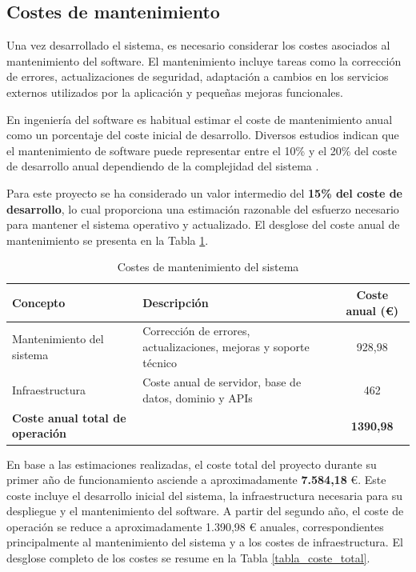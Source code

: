 \subsection{Costes de mantenimiento}

Una vez desarrollado el sistema, es necesario considerar los costes asociados al mantenimiento del software. El mantenimiento incluye tareas como la corrección de errores, actualizaciones de seguridad, adaptación a cambios en los servicios externos utilizados por la aplicación y pequeñas mejoras funcionales.

En ingeniería del software es habitual estimar el coste de mantenimiento anual como un porcentaje del coste inicial de desarrollo. Diversos estudios indican que el mantenimiento de software puede representar entre el 10\% y el 20\% del coste de desarrollo anual dependiendo de la complejidad del sistema \cite{pressman2014software}.

Para este proyecto se ha considerado un valor intermedio del \textbf{15\% del coste de desarrollo}, lo cual proporciona una estimación razonable del esfuerzo necesario para mantener el sistema operativo y actualizado. El desglose del coste anual de mantenimiento se presenta en la Tabla \ref{tabla_coste_mantenimiento}.


\begin{table}[H]
\centering
\caption{Costes de mantenimiento del sistema}
\label{tabla_coste_mantenimiento}
\begin{tabular}{|p{6cm}|p{6cm}|c|}
\hline
\textbf{Concepto} & \textbf{Descripción} & \textbf{Coste anual (€)} \\ \hline

Mantenimiento del sistema &
Corrección de errores, actualizaciones, mejoras y soporte técnico &
928,98 \\ \hline

Infraestructura &
Coste anual de servidor, base de datos, dominio y APIs &
462 \\ \hline

\textbf{Coste anual total de operación} & & \textbf{1390,98} \\ \hline

\end{tabular}
\end{table}

En base a las estimaciones realizadas, el coste total del proyecto durante su primer año de funcionamiento asciende a aproximadamente \textbf{7.584,18} €. Este coste incluye el desarrollo inicial del sistema, la infraestructura necesaria para su despliegue y el mantenimiento del software. A partir del segundo año, el coste de operación se reduce a aproximadamente 1.390,98 € anuales, correspondientes principalmente al mantenimiento del sistema y a los costes de infraestructura. El desglose completo de los costes se resume en la Tabla \ref{tabla_coste_total}.

